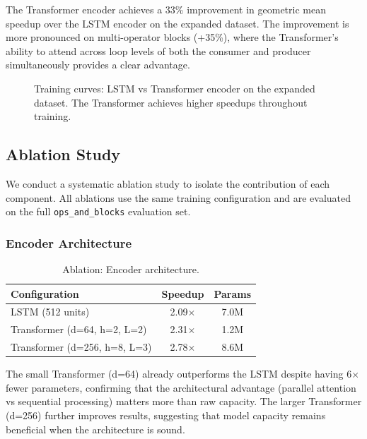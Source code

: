 \documentclass[10pt,twocolumn]{article}
\begin{document}
The Transformer encoder achieves a 33\% improvement in geometric mean speedup over the LSTM encoder on the expanded dataset. The improvement is more pronounced on multi-operator blocks (+35\%), where the Transformer's ability to attend across loop levels of both the consumer and producer simultaneously provides a clear advantage.

\begin{figure}[t]
\centering
{}
\caption{Training curves: LSTM vs Transformer encoder on the expanded dataset. The Transformer achieves higher speedups throughout training.}
\label{fig:lstm_vs_transformer}
\end{figure}

\subsection{Ablation Study}

We conduct a systematic ablation study to isolate the contribution of each component. All ablations use the same training configuration and are evaluated on the full \texttt{ops\_and\_blocks} evaluation set.

\subsubsection{Encoder Architecture}

\begin{table}[t]
\centering
\caption{Ablation: Encoder architecture.}
\label{tab:abl_encoder}
\begin{tabular}{lcc}
\toprule
Configuration & Speedup & Params \\
\midrule
LSTM (512 units) & 2.09$\times$ & 7.0M \\
Transformer (d=64, h=2, L=2) & 2.31$\times$ & 1.2M \\
Transformer (d=256, h=8, L=3) & 2.78$\times$ & 8.6M \\
\bottomrule
\end{tabular}
\end{table}

The small Transformer (d=64) already outperforms the LSTM despite having 6$\times$ fewer parameters, confirming that the architectural advantage (parallel attention vs sequential processing) matters more than raw capacity. The larger Transformer (d=256) further improves results, suggesting that model capacity remains beneficial when the architecture is sound.
\end{document}
